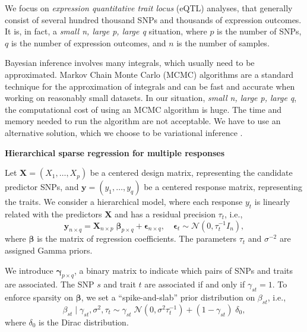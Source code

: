 \documentclass[final]{beamer}
\begin{document}
\begin{multicols*}{3}
We focus on \textit{expression quantitative trait locus} (eQTL) analyses, that generally consist of several hundred thousand SNPs and thousands of expression outcomes. It is, in fact, a \textit{small n, large p, large q} situation, where $p$ is the number of SNPs, $q$ is the number of expression outcomes, and $n$ is the number of samples.

Bayesian inference involves many integrals, which usually need to be approximated. Markov Chain Monte Carlo (MCMC) algorithms are a standard technique for the approximation of integrals and can be fast and accurate when working on reasonably small datasets. In our situation, \textit{small n, large p, large q}, the computational cost of using an MCMC algorithm is huge. The time and memory needed to run the algorithm are not acceptable. We have to use an alternative solution, which we choose to be variational inference \citet{varInf}. 

\vspace{1em}

\textbf{\large Hierarchical sparse regression for multiple responses}

\vspace{1em}
Let $\boldsymbol{X }= (X_1,\ldots,X_p)$ be a centered design matrix, representing the candidate predictor SNPs, and $\boldsymbol{y} = (y_1,\ldots,y_q)$ be a centered response matrix, representing the traits. We consider a hierarchical model, where each response $y_t$ is linearly related with the predictors $\boldsymbol{X}$ and has a residual precision $\tau_t$, i.e.,
\begin{equation*}
\label{eq:model}
\boldsymbol{y}_{n\times q} = \boldsymbol{X}_{n \times p}\;\boldsymbol{\beta}_{p \times q}+\boldsymbol{\epsilon}_{n \times q},\quad\boldsymbol{\epsilon}_t \sim \mathcal{N}(0,\tau_t^{-1}I_n),
\end{equation*}
where $\boldsymbol{\beta}$ is the matrix of regression coefficients. The parameters $\tau_t$ and $\sigma^{-2}$ are assigned Gamma priors.

We introduce $\boldsymbol{\gamma}_{p\times q}$, a binary matrix to indicate which pairs of SNPs and traits are associated. The SNP $s$ and trait $t$ are associated if and only if $\gamma_{st} = 1$. To enforce sparsity on $\boldsymbol{\beta}$, we set a ``spike-and-slab'' prior distribution on $\beta_{st}$, i.e.,
\begin{equation*}
\beta_{st} \mid \gamma_{st},\sigma^2, \tau_t \sim \gamma_{st}\;\mathcal{N}(0,\sigma^2\tau_t^{-1})+(1-\gamma_{st})\;\delta_0,
\end{equation*}
where $\delta_0$ is the Dirac distribution.


\end{multicols*}
\end{document}
